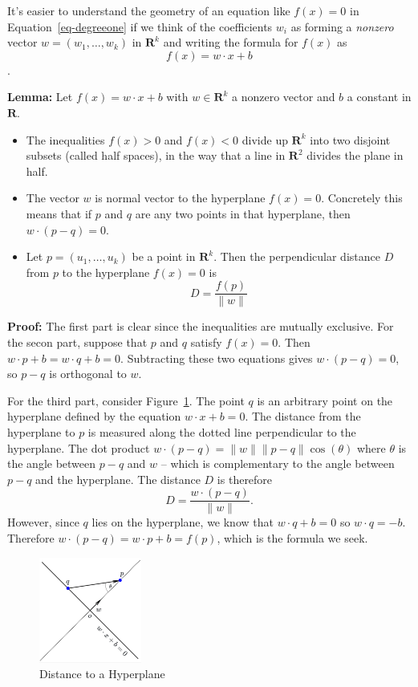 \documentclass[
  11pt,
  letterpaper,
]{scrbook}
\providecommand{\tightlist}{%
  \setlength{\itemsep}{0pt}\setlength{\parskip}{0pt}}\usepackage{longtable,booktabs,array}
\theoremstyle{plain}
\theoremstyle{plain}
\theoremstyle{remark}
\begin{document}
It's easier to understand the geometry of an equation like \(f(x)=0\) in
Equation~\ref{eq-degreeone} if we think of the coefficients \(w_i\) as
forming a \emph{nonzero} vector \(w = (w_1,\ldots, w_k)\) in
\(\mathbf{R}^{k}\) and writing the formula for \(f(x)\) as \[
f(x) = w\cdot x +b
\].

\textbf{Lemma:} Let \(f(x)=w\cdot x+b\) with \(w\in\mathbf{R}^{k}\) a
nonzero vector and \(b\) a constant in \(\mathbf{R}\).

\begin{itemize}
\tightlist
\item
  The inequalities \(f(x)>0\) and \(f(x)<0\) divide up
  \(\mathbf{R}^{k}\) into two disjoint subsets (called half spaces), in
  the way that a line in \(\mathbf{R}^{2}\) divides the plane in half.
\item
  The vector \(w\) is normal vector to the hyperplane \(f(x)=0\).
  Concretely this means that if \(p\) and \(q\) are any two points in
  that hyperplane, then \(w\cdot (p-q)=0\).
\item
  Let \(p=(u_1,\ldots,u_k)\) be a point in \(\mathbf{R}^{k}\). Then the
  perpendicular distance \(D\) from \(p\) to the hyperplane \(f(x)=0\)
  is \[
  D = \frac{f(p)}{\|w\|}
  \]
\end{itemize}

\textbf{Proof:} The first part is clear since the inequalities are
mutually exclusive. For the secon part, suppose that \(p\) and \(q\)
satisfy \(f(x)=0\). Then \(w\cdot p+b = w\cdot q+b=0\). Subtracting
these two equations gives \(w\cdot (p-q)=0\), so \(p-q\) is orthogonal
to \(w\).

For the third part, consider Figure~\ref{fig-triangle}. The point \(q\)
is an arbitrary point on the hyperplane defined by the equation
\(w\cdot x+b=0\). The distance from the hyperplane to \(p\) is measured
along the dotted line perpendicular to the hyperplane. The dot product
\(w\cdot (p-q) = \|w\|\|p-q\|\cos(\theta)\) where \(\theta\) is the
angle between \(p-q\) and \(w\) -- which is complementary to the angle
between \(p-q\) and the hyperplane. The distance \(D\) is therefore \[
D=\frac{w\cdot(p-q)}{\|w\|}.
\] However, since \(q\) lies on the hyperplane, we know that
\(w\cdot q+b=0\) so \(w\cdot q = -b\). Therefore
\(w\cdot(p-q)=w\cdot p+b=f(p)\), which is the formula we seek.

\begin{figure}

{\centering \includegraphics[width=0.3\textwidth,height=\textheight]{chapters/img/triangle.png}

}

\caption{\label{fig-triangle}Distance to a Hyperplane}

\end{figure}
\end{document}
